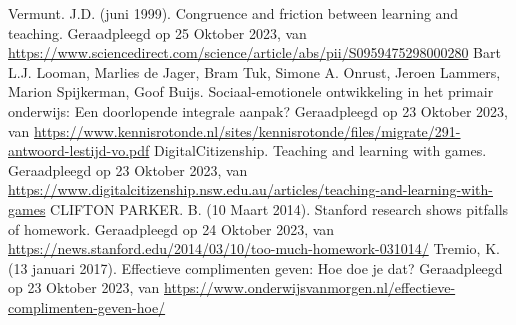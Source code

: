 \begin{thebibliography}{9}
                Vermunt. J.D. (juni 1999). Congruence and friction between learning and teaching. Geraadpleegd op 25 Oktober 2023, van \url{https://www.sciencedirect.com/science/article/abs/pii/S0959475298000280}
                Bart L.J. Looman, Marlies de Jager, Bram Tuk, Simone A. Onrust, Jeroen Lammers, Marion Spijkerman, Goof Buijs. Sociaal-emotionele ontwikkeling in het primair onderwijs: Een doorlopende integrale aanpak? Geraadpleegd op 23 Oktober 2023, van \url{https://www.kennisrotonde.nl/sites/kennisrotonde/files/migrate/291-antwoord-lestijd-vo.pdf}
                DigitalCitizenship. Teaching and learning with games. Geraadpleegd op 23 Oktober 2023, van \url{https://www.digitalcitizenship.nsw.edu.au/articles/teaching-and-learning-with-games}
                CLIFTON PARKER. B. (10 Maart 2014). Stanford research shows pitfalls of homework. Geraadpleegd op 24 Oktober 2023, van \url{https://news.stanford.edu/2014/03/10/too-much-homework-031014/}
                Tremio, K. (13 januari 2017). Effectieve complimenten geven: Hoe doe je dat? Geraadpleegd op 23 Oktober 2023, van \url{https://www.onderwijsvanmorgen.nl/effectieve-complimenten-geven-hoe/}
        \newpage
       

\end{thebibliography}
